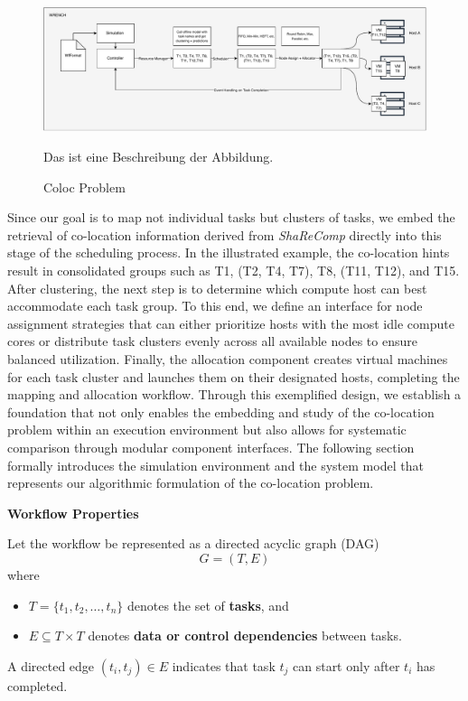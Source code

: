\begin{figure}[H]
    \centering
    \includegraphics[scale=0.45]{fig/04/04-coloc-problem.pdf}
    \caption{Coloc Problem}
    \label{fig:04-coloc-problem}
    \tiny
    Das ist eine Beschreibung der Abbildung.
\end{figure}

Since our goal is to map not individual tasks but clusters of tasks, we embed the retrieval of co-location information derived from \textit{ShaReComp} directly into this stage of the scheduling process. In the illustrated example, the co-location hints result in consolidated groups such as T1, (T2, T4, T7), T8, (T11, T12), and T15. After clustering, the next step is to determine which compute host can best accommodate each task group. To this end, we define an interface for node assignment strategies that can either prioritize hosts with the most idle compute cores or distribute task clusters evenly across all available nodes to ensure balanced utilization. Finally, the allocation component creates virtual machines for each task cluster and launches them on their designated hosts, completing the mapping and allocation workflow. Through this exemplified design, we establish a foundation that not only enables the embedding and study of the co-location problem within an execution environment but also allows for systematic comparison through modular component interfaces. The following section formally introduces the simulation environment and the system model that represents our algorithmic formulation of the co-location problem.


\textbf{Workflow Properties}

Let the workflow be represented as a directed acyclic graph (DAG)
\[
    G = (T, E)
\]
where
\begin{itemize}
    \item $T = \{t_1, t_2, \dots, t_n\}$ denotes the set of \textbf{tasks}, and
    \item $E \subseteq T \times T$ denotes \textbf{data or control dependencies} between tasks.
\end{itemize}
A directed edge $(t_i, t_j) \in E$ indicates that task $t_j$ can start only after $t_i$ has completed.

